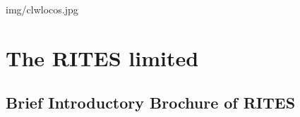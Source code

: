 \documentclass[11pt,twoside,openany,svgnames,x11names]{gkbookm1}
\begin{document}

%



{img/clwlocos.jpg}


\chapter[The RITES limited]{The RITES limited}
\renewcommand\chapterillustration{img/RITESlogo3.jpg}

\section{Brief Introductory Brochure of RITES}
 


\end{document}
